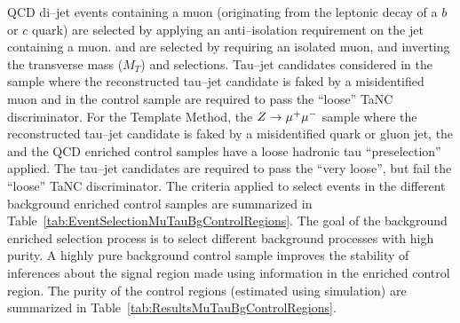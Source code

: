 QCD di--jet events containing a muon (originating from the leptonic decay of a
$b$ or $c$ quark) are selected by applying an anti--isolation requirement
on the jet containing a muon.  \WpJets and \ttbarpJets are selected by requiring
an isolated muon, and inverting the transverse mass ($M_T$) and \Pzeta
selections.   Tau--jet candidates considered in the \ZMM sample where the
reconstructed tau--jet candidate is faked by a misidentified muon and in the
\ttbarpJets control sample are required to pass the ``loose'' TaNC
discriminator.  For the Template Method, the $\mbox{\ensuremath{Z\to\mu^+\mu^-}}$ sample where the
reconstructed tau--jet candidate is faked by a misidentified quark or gluon jet,
the \WpJets and the QCD enriched control samples have a loose hadronic tau
``preselection'' applied. The tau--jet candidates are required to pass the
``very loose'', but fail the ``loose'' TaNC discriminator.  The criteria applied
to select events in the different background enriched control samples are
summarized in Table~\ref{tab:EventSelectionMuTauBgControlRegions}.  The goal of
the background enriched selection process is to select different background
processes with high purity.  A highly pure background control sample improves
the stability of inferences about the signal region made using information in
the enriched control region.  The purity of the control regions (estimated using
simulation) are summarized in Table~\ref{tab:ResultsMuTauBgControlRegions}.
%
